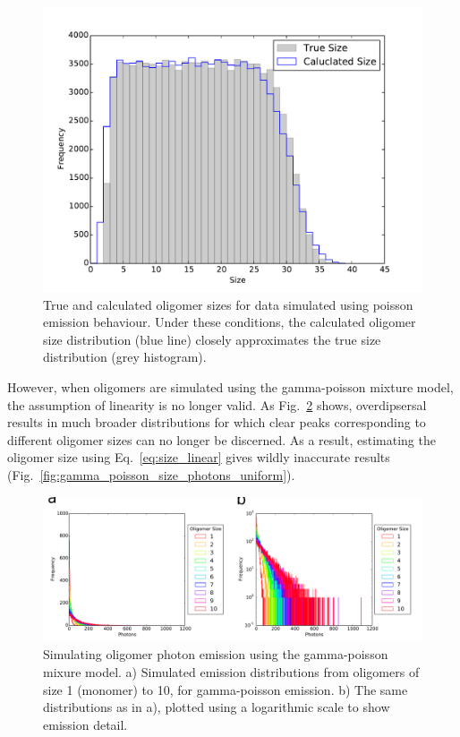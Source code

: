 \begin{figure}
   \begin{center}
      \includegraphics*[clip=true, width=6in]{sizing/True_vs_Measured_oligomer_events_uniform_poisson_100000_hist.pdf}
      \caption{True and calculated oligomer sizes for data simulated using poisson emission behaviour. Under these conditions, the calculated oligomer size distribution (blue line) closely approximates the true size distribution (grey histogram).}
      \label{fig:poisson_size_photons_uniform}
   \end{center}
\end{figure}

However, when oligomers are simulated using the gamma-poisson mixture model, the assumption of linearity is no longer valid. As Fig.~\ref{fig:gamma_poisson_size_photons} shows, overdipsersal results in much broader distributions for which clear peaks corresponding to different oligomer sizes can no longer be discerned. As a result, estimating the oligomer size using Eq.~\ref{eq:size_linear} gives wildly inaccurate results (Fig.~\ref{fig:gamma_poisson_size_photons_uniform}).

\begin{figure}
   \begin{center}
      \includegraphics*[clip=true, width=6in]{sizing/gamma_poisson_size_photons.pdf}
      \caption{Simulating oligomer photon emission using the gamma-poisson mixure model. a) Simulated emission distributions from oligomers of size 1 (monomer) to 10, for gamma-poisson emission. b) The same distributions as in a), plotted using a logarithmic scale to show emission detail.}
      \label{fig:gamma_poisson_size_photons}
   \end{center}
\end{figure}

